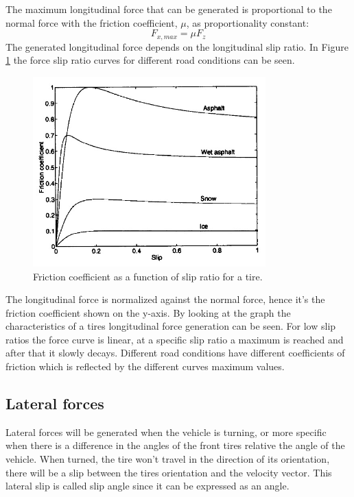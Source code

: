 The maximum longitudinal force that can be generated is proportional to the normal force with the friction coefficient, $ \mu $, as proportionality constant:
\begin{equation}
F_{x,max} =  \mu F_{z}
\label{eq:fxmufz}
\end{equation}
The generated longitudinal force depends on the longitudinal slip ratio. In Figure \ref{fric_slip} the force slip ratio curves for different road conditions can be seen.
\begin{figure}[h]
	\centering
	\includegraphics[width=0.8\textwidth]{Pictures/fric_slip}
	\caption{Friction coefficient as a function of slip ratio for a tire. \cite{gustafsson1997}}
	\label{fric_slip}
\end{figure}
The longitudinal force is normalized against the normal force, hence it's the friction coefficient shown on the y-axis. By looking at the graph the characteristics of a tires longitudinal force generation can be seen. For low slip ratios the force curve is linear, at a specific slip ratio a maximum is reached and after that it slowly decays. Different road conditions have different coefficients of friction which is reflected by the different curves maximum values.

\subsection{Lateral forces}
Lateral forces will be generated when the vehicle is turning, or more specific when there is a difference in the angles of the front tires relative the angle of the vehicle. When turned, the tire won't travel in the direction of its orientation, there will be a slip between the tires orientation and the velocity vector. This lateral slip is called slip angle since it can be expressed as an angle.

